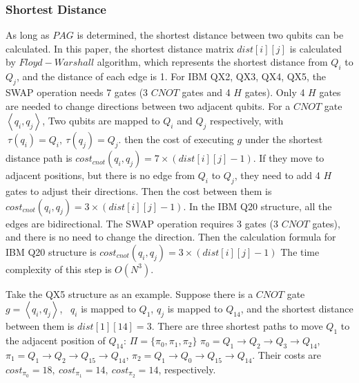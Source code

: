 \documentclass[runningheads]{llncs}
\begin{document}
\subsubsection{Shortest Distance}
As long as $PAG$ is determined, 
the shortest distance between two qubits can be calculated. 
In this paper, the shortest distance matrix $dist[i][j]$ is calculated by $Floyd-Warshall$ algorithm, 
which represents the shortest distance from $Q_{i}$ to $Q_{j}$, 
and the distance of each edge is 1. 
For IBM QX2, QX3, QX4, QX5, the SWAP operation needs 7 gates 
(3 $CNOT$ gates and 4 $H$ gates). 
Only 4 $H$ gates are needed to change directions between two adjacent qubits. 
For a $CNOT$ gate $\left \langle  q_{i},q_{j} \right \rangle $,
Two qubits are mapped to $Q_{i}$ and $Q_{j}$ respectively, with $\ \tau(q_{i})=Q_{i},\ \tau(q_{j})=Q_{j}$.
then the cost of executing $g$ under the shortest distance path is $cost_{cnot}(q_{i},q_{j})=7 \times( dist[i][j]-1)$.
If they move to adjacent positions, but there is no edge from $Q_{i}$ to $Q_{j}$,
they need to add 4 $H$ gates to adjust their directions.
 Then the cost between them is $cost_{cnot}(q_{i},q_{j})=3 \times( dist[i][j]-1)$.
In the IBM Q20 structure, all the edges are bidirectional. 
The SWAP operation requires 3 gates (3 $CNOT$ gates), 
and there is no need to change the direction. 
Then the calculation formula for IBM Q20 structure is $cost_{cnot}(q_{i},q_{j})=3 \times( dist[i][j]-1)$
The time complexity of this step is $O (N^{3})$.
\begin{example}
	Take the QX5 structure as an example.
Suppose there is a $CNOT$ gate $g=\left \langle  q_{i}, q_{j} \right \rangle $, \ $q_{i}$ is mapped to $Q_{1}$, 
 $q_{j}$ is mapped to $Q_{14}$, 
and the shortest distance between them  is $dist[1][14]=3$.
There are three shortest paths to move $Q_{1}$ to the adjacent position of $Q_{14}$:
$\Pi=\{\pi_{0},\pi_{1},\pi_{2}\}$
$\pi_{0}={Q_{1}\rightarrow Q_{2} \rightarrow Q_{3} \rightarrow Q_{14}}$,
$\pi_{1}={Q_{1}\rightarrow Q_{2} \rightarrow Q_{15} \rightarrow Q_{14}}$,
$\pi_{2}={Q_{1}\rightarrow Q_{0} \rightarrow Q_{15} \rightarrow Q_{14}}$.
Their costs are 
$cost_{\pi_{0}}=18,\ cost_{\pi_{1}}=14,\ cost_{\pi_{2}}=14$, respectively.
\end{example}
\end{document}
